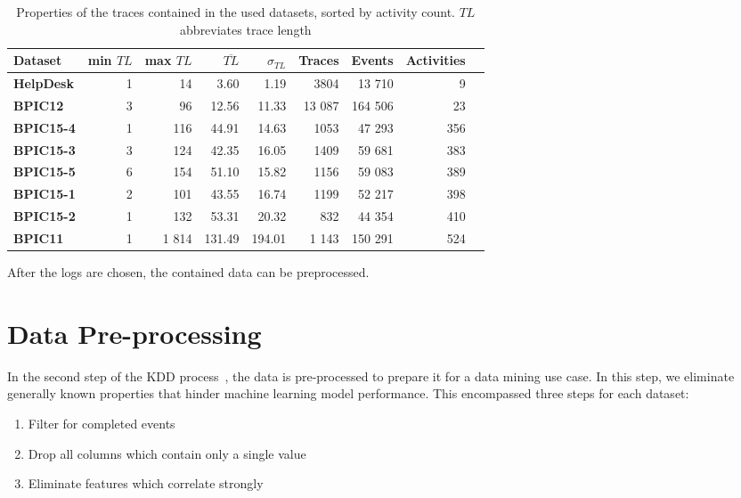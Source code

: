 \begin{table}
  \centering
  \begin{adjustbox}{center}
  \begin{tabular}{lrrrrrrrr}
  \textbf{Dataset} & \textbf{min $TL$} & \textbf{max $TL$} & \textbf{$\overline{TL}$} & \textbf{$\sigma_{TL}$} & \textbf{Traces} & \textbf{Events} & \textbf{Activities} \\
  \midrule
  \textbf{HelpDesk} & 1 & 14  & 3.60  & 1.19  & 3804   &  13 710 & 9\\
  \textbf{BPIC12}   & 3 & 96  & 12.56 & 11.33 & 13 087 & 164 506 & 23\\
  \textbf{BPIC15-4} & 1 & 116 & 44.91 & 14.63 & 1053 & 47 293 & 356\\
  \textbf{BPIC15-3} & 3 & 124 & 42.35 & 16.05 & 1409 & 59 681 & 383\\
  \textbf{BPIC15-5} & 6 & 154 & 51.10 & 15.82 & 1156 & 59 083 & 389\\
  \textbf{BPIC15-1} & 2 & 101 & 43.55 & 16.74 & 1199 & 52 217 & 398\\
  \textbf{BPIC15-2} & 1 & 132 & 53.31 & 20.32 & 832 & 44 354 & 410\\
  \textbf{BPIC11}  & 1 & 1 814& 131.49&194.01 & 1 143 & 150 291 & 524
  \end{tabular}
  \end{adjustbox}
  \caption[Trace properties in each dataset]{Properties of the traces contained in the used datasets, sorted by activity count. $TL$ abbreviates trace length}
  \label{tab:dataset-characteristics}
\end{table}

After the logs are chosen, the contained data can be preprocessed.

\section{Data Pre-processing}\label{sec:method:data-preprocessing}
In the second step of the KDD process~\cite{fayyad1996data}, the data is pre-processed to prepare it for a data mining use case. In this step, we eliminate generally known properties that hinder machine learning model performance. This encompassed three steps for each dataset:

\begin{enumerate}
    \item Filter for completed events
    \item Drop all columns which contain only a single value
    \item Eliminate features which correlate strongly
\end{enumerate}

